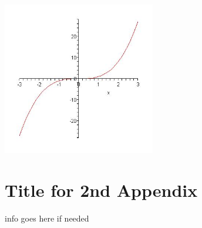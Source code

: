 \documentclass[MS, xcolor=dvipsnames]{wfuthesis} %
\begin{document}
\includegraphics[width=0.5\textwidth]{picture.jpg}

\chapter{Title for 2nd Appendix}


\vita

info goes here if needed
\end{document}
